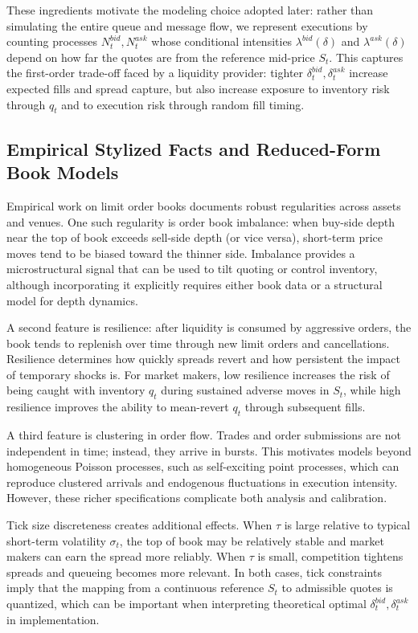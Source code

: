 These ingredients motivate the modeling choice adopted later: rather than simulating the entire queue and message flow, we represent executions by counting processes $N_t^{bid},N_t^{ask}$ whose conditional intensities $\lambda^{bid}(\delta)$ and $\lambda^{ask}(\delta)$ depend on how far the quotes are from the reference mid-price $S_t$. This captures the first-order trade-off faced by a liquidity provider: tighter $\delta_t^{bid},\delta_t^{ask}$ increase expected fills and spread capture, but also increase exposure to inventory risk through $q_t$ and to execution risk through random fill timing.

\subsection{Empirical Stylized Facts and Reduced-Form Book Models}
Empirical work on limit order books documents robust regularities across assets and venues. One such regularity is order book imbalance: when buy-side depth near the top of book exceeds sell-side depth (or vice versa), short-term price moves tend to be biased toward the thinner side. Imbalance provides a microstructural signal that can be used to tilt quoting or control inventory, although incorporating it explicitly requires either book data or a structural model for depth dynamics.

A second feature is resilience: after liquidity is consumed by aggressive orders, the book tends to replenish over time through new limit orders and cancellations. Resilience determines how quickly spreads revert and how persistent the impact of temporary shocks is. For market makers, low resilience increases the risk of being caught with inventory $q_t$ during sustained adverse moves in $S_t$, while high resilience improves the ability to mean-revert $q_t$ through subsequent fills.

A third feature is clustering in order flow. Trades and order submissions are not independent in time; instead, they arrive in bursts. This motivates models beyond homogeneous Poisson processes, such as self-exciting point processes, which can reproduce clustered arrivals and endogenous fluctuations in execution intensity. However, these richer specifications complicate both analysis and calibration.

Tick size discreteness creates additional effects. When $\tau$ is large relative to typical short-term volatility $\sigma_t$, the top of book may be relatively stable and market makers can earn the spread more reliably. When $\tau$ is small, competition tightens spreads and queueing becomes more relevant. In both cases, tick constraints imply that the mapping from a continuous reference $S_t$ to admissible quotes is quantized, which can be important when interpreting theoretical optimal $\delta_t^{bid},\delta_t^{ask}$ in implementation.

